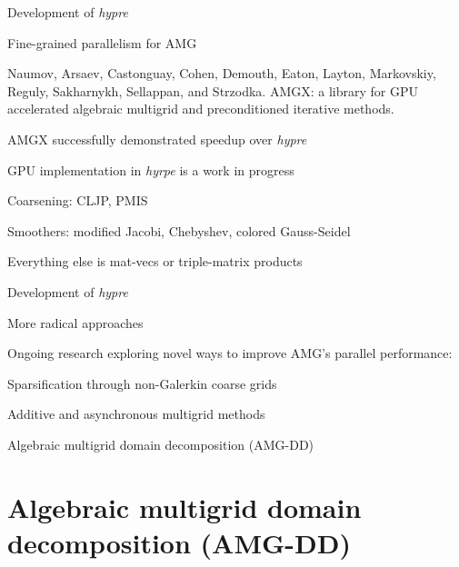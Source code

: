 \documentclass[18pt,xcolor=table]{beamer}
\begin{document}
\begin{frame}{Development of \emph{hypre}}
\begin{block}{Fine-grained parallelism for AMG}
\bit
\item Naumov, Arsaev, Castonguay, Cohen, Demouth, Eaton, Layton, Markovskiy, Reguly, Sakharnykh, Sellappan, and Strzodka. AMGX: a library for GPU accelerated algebraic multigrid and preconditioned iterative methods.
\item AMGX successfully demonstrated speedup over \emph{hypre}
\item GPU implementation in \emph{hyrpe} is a work in progress
\item Coarsening: CLJP, PMIS
\item Smoothers: modified Jacobi, Chebyshev, colored Gauss-Seidel
\item Everything else is mat-vecs or triple-matrix products
\eit
\end{block}
\end{frame}

\begin{frame}{Development of \emph{hypre}}
\begin{block}{More radical approaches}
\bit
\item Ongoing research exploring novel ways to improve AMG's parallel performance:
\bit
\item Sparsification through non-Galerkin coarse grids
\item Additive and asynchronous multigrid methods
\item Algebraic multigrid domain decomposition (AMG-DD)
\eit
\eit
\end{block}
\end{frame}



\section{Algebraic multigrid domain decomposition (AMG-DD)}
\end{document}

